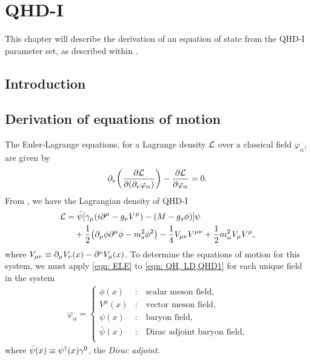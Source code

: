 \chapter{QHD-I}

This chapter will describe the derivation of an equation of state from the QHD-I parameter set, as described within \autocite{diener_2008}.

\section{Introduction}


\section{Derivation of equations of motion}

The Euler-Lagrange equations, for a Lagrange density $\mathcal{L}$ over a classical field $\varphi_\alpha$, are given by
\begin{align}\label{eqn: ELE}
    \partial_\nu\qty(\pdv{\mathcal{L}}{(\partial_\nu \varphi_\alpha)}) - \pdv{\mathcal{L}}{\varphi_\alpha} = 0.
\end{align}
From \autocite[p. 56]{diener_2008}, we have the Lagrangian density of QHD-I
\begin{align} \label{eqn: QH, LD,QHD1}
    \Lag & = \bar{\psi} \bqty{\gamma_\mu(i\p^\mu -g_\nu V^\mu) - (M-g_s\phi)} \psi \nonumber\\
    & \quad + \frac{1}{2} \pqty{\p_\mu \phi \p^\mu \phi - m_s^2 \phi^2} - \frac{1}{4} V_{\mu\nu}V^{\mu\nu} + \frac{1}{2} m_\omega^2 V_\mu V^\mu,
\end{align}
where $V_{\mu\nu}\equiv\partial_\mu V_\nu (x) - \partial^\nu V_\mu(x)$. To determine the equations of motion for this system, we must apply \eqref{eqn: ELE} to \eqref{eqn: QH, LD,QHD1} for each unique field in the system
\begin{align*}
    \varphi_\alpha = \begin{cases}
        \phi(x) &: \quad \text{scalar meson field,}\\
        V^\mu(x) &: \quad \text{vector meson field,}\\
        \psi(x) &: \quad \text{baryon field,}\\
        \bar\psi(x) &: \quad \text{Dirac adjoint baryon field,}\\
    \end{cases}
\end{align*}
where $\bar\psi(x) \equiv \psi^\dagger(x)\gamma^0$, the \emph{Dirac adjoint.}

